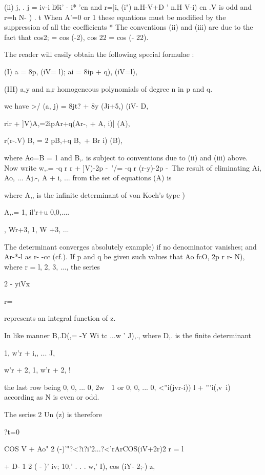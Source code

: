{{(ii) j, . j = iv-i li6i' - i* 'en and r=|i, (i") n.H-V+D ' n.H V-i)
en .V is odd and r=h N- ) . t When A'=0 or 1 these equations must be
modified by the suppression of all the coefficients * The conventions
(ii) and (iii) are due to the fact that cos2; = cos (-2), cos 22 = cos
(- 22).

%
%

The reader will easily obtain the following special formulae :

(I) a = 8p, (iV= l); ai = 8ip + q), (iV=l),

(III) a,y and n,r homogeneous polynomials of degree n in p and q.

we have >/ (a, j) = 8jt? + 8y (Ji+5,) (iV- D,

rir + ]V)A,=2ipAr+q(Ar-, + A, i)] (A),

r(r-.V) B, = 2 pB,+q B,\, + Br i) (B),

where Ao=B = 1 and B,. is subject to conventions due to (ii) and (iii)
above. Now write w,.= -q r r + ]V)-2p -\ '/= -q r (r-y)-2p -\ The
result of eliminating Ai, Ao, ... Aj.-, A + i, ... from the set of
equations (A) is

where A,, is the infinite determinant of von Koch's type )

A,.= 1, il'r+u 0,0,....

, Wr+3, 1, W +3, ...

The determinant converges absolutely  example) if no
denominator vanishes; and Ar-*-l as r- -cc (cf.). If p and q
be given such values that Ao fcO, 2p r r- N), where r = l, 2, 3, ...,
the series

2 - yiVx%

r=\

represents an integral function of z.

In like manner B,.D(,= -Y Wi tc ...w ' J),., where D,. is the finite
determinant

1, w'r + i,, ... J,

w'r + 2, 1, w'r + 2,  !

the last row being 0, 0, ... 0, 2w\ \, 1 or 0, 0, ... 0, <''i(jvr-i))
l + '''i(,v\ i) according as N is even or odd.

The series 2 Un (z) is therefore

?t=0

COS V + Ao" 2 (-)'"?<?i?i'2...?<'rArCOS(iV+2r)2 r = l

+ D- 1 2 ( - )' iv; 10,' . . . w,' I), cos (iY- 2;-) z,

}}
